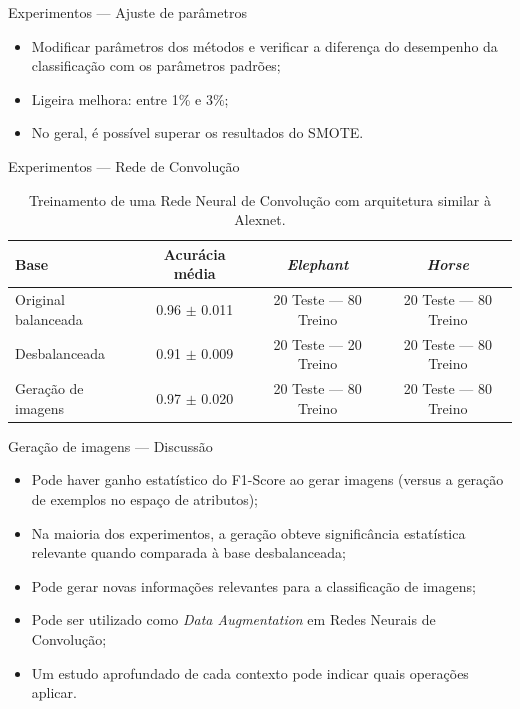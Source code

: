 \documentclass[10pt]{beamer}
\begin{document}
\begin{frame}{Experimentos --- Ajuste de parâmetros}
  \setlength\leftmargini{1em}
  \begin{itemize}
    \item Modificar parâmetros dos métodos e verificar a diferença do desempenho da classificação com os parâmetros padrões;
    \item Ligeira melhora: entre 1\% e 3\%;
    \item No geral, é possível superar os resultados do SMOTE.
  \end{itemize}
\end{frame}
\begin{frame}{Experimentos --- Rede de Convolução}
  \setlength\leftmargini{1em}
  \begin{table}
    \footnotesize{
    \caption{Treinamento de uma Rede Neural de Convolução com arquitetura similar à Alexnet.}
    \begin{tabular}{l|c|c|c}
      Base                    &  Acurácia média & \textit{Elephant} &  \textit{Horse}\\ \hline
      Original balanceada     &  0.96 $\pm$ 0.011 & 20 Teste --- 80 Treino & 20 Teste --- 80 Treino\\
      Desbalanceada           &  0.91 $\pm$ 0.009 & 20 Teste --- 20 Treino & 20 Teste --- 80 Treino\\
      Geração de imagens      &  0.97 $\pm$ 0.020 & 20 Teste --- 80 Treino & 20 Teste --- 80 Treino\\
    \end{tabular}
    }
  \end{table}
\end{frame}
\begin{frame}{Geração de imagens --- Discussão}
  \setlength\leftmargini{1em}
  \begin{itemize}
    \item Pode haver ganho estatístico do F1-Score ao gerar imagens (versus a geração de exemplos no espaço de atributos);
    \item Na maioria dos experimentos, a geração obteve significância estatística relevante quando comparada à base desbalanceada;
    \item Pode gerar novas informações relevantes para a classificação de imagens;
    \item Pode ser utilizado como \textit{Data Augmentation} em Redes Neurais de Convolução;
    \item Um estudo aprofundado de cada contexto pode indicar quais operações aplicar.
  \end{itemize}
\end{frame}
\end{document}
